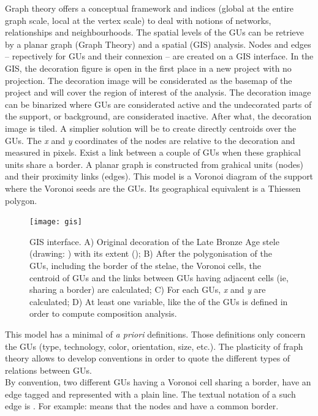 \documentclass[article]{jss}\usepackage[]{graphicx}\usepackage[]{color}
\begin{document}
Graph theory offers a conceptual framework and indices (global at the entire graph scale, local at the vertex scale) to deal with notions of networks, relationships and neighbourhoods. The spatial levels of the GUs can be retrieve by a planar graph (Graph Theory) and a spatial (GIS) analysis.
Nodes and edges -- repectively for GUs and their connexion -- are created on a GIS interface. 
In the GIS, the decoration figure is open in the first place in a new project with no projection. The decoration image will be considerated as the basemap of the project and will cover the region of interest of the analysis. The decoration image can be binarized where GUs are considerated active and the undecorated parts of the support, or background, are considerated inactive. After what, the decoration image is tiled. A simplier solution will be to create directly centroids over the GUs. The \emph{x} and \emph{y} coordinates of the nodes are relative to the decoration and measured in pixels.
Exist a link between a couple of GUs when these graphical units share a border. A planar graph is constructed from grahical units (nodes) and their proximity links (edges). This model is a Voronoi diagram of the support where the Voronoi seeds are the GUs. Its geographical equivalent is a Thiessen polygon.


\begin{figure}[H]
\centering
\texttt{[image: gis]}
\caption{\label{fig:gis} GIS interface. A) Original decoration of the Late Bronze Age  stele (drawing: \cite{DiazGuardamino10}) with its extent (); B) After the polygonisation of the GUs, including the border of the stelae, the Voronoi cells, the centroid of GUs and the links between GUs having adjacent cells (ie, sharing a border) are calculated; C) For each GUs, \emph{x} and \emph{y} are calculated; D) At least one variable, like the  of the GUs is defined in order to compute composition analysis.}
\end{figure}

This model has a minimal of \emph{a priori} definitions. Those definitions only concern the GUs (type, technology, color, orientation, size, etc.). The plasticity of fraph theory allows to develop conventions in order to quote the different types of relations between GUs.\\

By convention, two different GUs having a Voronoi cell sharing a border, have an edge tagged  and represented with a plain line. The textual notation of a such edge is . For example:  means that the nodes  and  have a common border.
\end{document}
